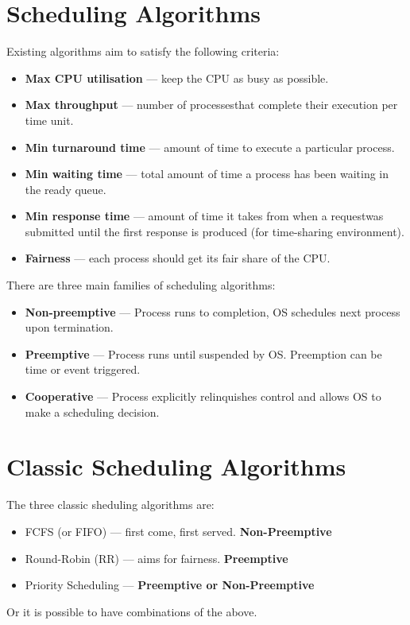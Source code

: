 \documentclass{article}
\begin{document}
\section{Scheduling Algorithms}
Existing algorithms aim to satisfy the following criteria:
\begin{itemize}
	\item \textbf{Max CPU utilisation} --- keep the CPU as busy as possible.
	\item \textbf{Max throughput} --- number of processesthat complete their execution per time unit.
	\item \textbf{Min turnaround time} --- amount of time to execute a particular process.
	\item \textbf{Min waiting time} --- total amount of time a process has been waiting in the ready queue.
	\item \textbf{Min response time} --- amount of time it takes from when a requestwas submitted until the first response is produced (for time-sharing environment).
	\item \textbf{Fairness} --- each process should get its fair share of the CPU.
\end{itemize}

There are three main families of scheduling algorithms:
\begin{itemize}
	\item \textbf{Non-preemptive} --- Process runs to completion, OS schedules next process upon termination.
	\item \textbf{Preemptive} --- Process runs until suspended by OS. Preemption can be time or event triggered.
	\item \textbf{Cooperative} --- Process explicitly relinquishes control and allows OS to make a scheduling decision.
\end{itemize}

\section{Classic Scheduling Algorithms}
The three classic sheduling algorithms are:
\begin{itemize}
	\item FCFS (or FIFO) --- first come, first served. \textbf{Non-Preemptive}
	\item Round-Robin (RR) --- aims for fairness. \textbf{Preemptive}
	\item Priority Scheduling --- \textbf{Preemptive or Non-Preemptive}
\end{itemize}
Or it is possible to have combinations of the above.
\end{document}
